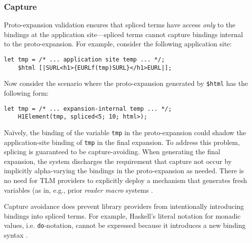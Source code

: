 \documentclass[acmsmall,review,anonymous]{acmart}\settopmatter{printfolios=true,printccs=false,printacmref=false}
\newcommand{\li}[1]{\lstinline[basicstyle=\ttfamily\fontsize{9pt}{1em}\selectfont]{#1}}
\begin{document}
\subsubsection{Capture}\label{sec:capture}

Proto-expansion validation ensures that spliced terms have access \emph{only} to the bindings at the application site---spliced terms cannot capture bindings internal to the proto-expansion. For example, consider the following application site:
\begin{lstlisting}[numbers=none]
    let tmp = /* ... application site temp ... */;
    $html [|SURL<h1>{EURLf(tmp)SURL}</h1>EURL|];
\end{lstlisting}
Now consider the scenario where the proto-expansion generated by \li{$html} has the following form:
\begin{lstlisting}[numbers=none]
    let tmp = /* ... expansion-internal temp ... */;
    H1Element(tmp, spliced<5; 10; html>);
\end{lstlisting}
Na\"ively, the binding of the variable \li{tmp} in the proto-expansion could shadow the application-site binding of \li{tmp} in the final expansion. 
To address this problem, splicing is guaranteed to be capture-avoiding. When generating the final expansion, the system discharges the requirement that capture not occur by implicitly alpha-varying the bindings in the proto-expansion as needed. There is no need for TLM providers to explicitly deploy a mechanism that generates fresh variables (as in, e.g., prior \emph{reader macro} systems \cite{Flatt:2012:CLR:2063176.2063195}.


Capture avoidance does prevent library providers from intentionally introducing bindings into spliced terms. For example, Haskell's literal notation for monadic values, i.e. \li{do}-notation, cannot be expressed because it introduces a new binding syntax \cite{jones2003haskell}.
\end{document}
